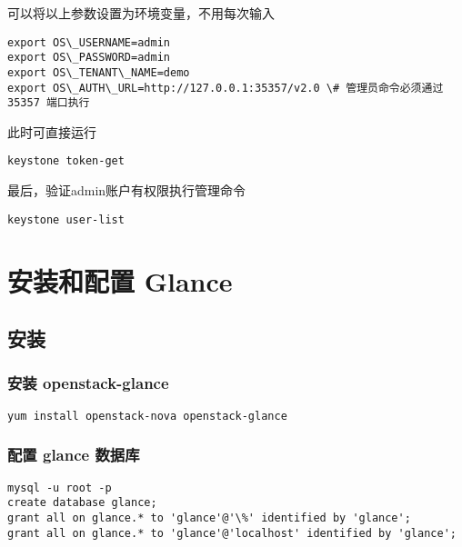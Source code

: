 \documentclass[letterpaper,10pt,english]{sphinxmanual}
\begin{document}
可以将以上参数设置为环境变量，不用每次输入

\begin{Verbatim}[commandchars=\\\{\}]
export OS\_USERNAME=admin
export OS\_PASSWORD=admin
export OS\_TENANT\_NAME=demo
export OS\_AUTH\_URL=http://127.0.0.1:35357/v2.0 \# 管理员命令必须通过 35357 端口执行
\end{Verbatim}

此时可直接运行

\begin{Verbatim}[commandchars=\\\{\}]
keystone token-get
\end{Verbatim}

最后，验证admin账户有权限执行管理命令

\begin{Verbatim}[commandchars=\\\{\}]
keystone user-list
\end{Verbatim}


\chapter{安装和配置 Glance}
\label{glance:glance}\label{glance::doc}

\section{安装}
\label{glance:id1}

\subsection{安装 openstack-glance}
\label{glance:openstack-glance}
\begin{Verbatim}[commandchars=\\\{\}]
yum install openstack-nova openstack-glance
\end{Verbatim}


\subsection{配置 glance 数据库}
\label{glance:id2}
\begin{Verbatim}[commandchars=\\\{\}]
mysql -u root -p
create database glance;
grant all on glance.* to 'glance'@'\%' identified by 'glance';
grant all on glance.* to 'glance'@'localhost' identified by 'glance';
\end{Verbatim}
\end{document}
